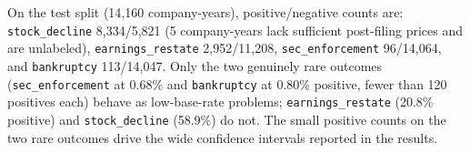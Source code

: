 On the test split (14{,}160 company-years), positive/negative counts are: \texttt{stock\_decline} 8{,}334/5{,}821 (5 company-years lack sufficient post-filing prices and are unlabeled), \texttt{earnings\_restate} 2{,}952/11{,}208, \texttt{sec\_enforcement} 96/14{,}064, and \texttt{bankruptcy} 113/14{,}047. Only the two genuinely rare outcomes (\texttt{sec\_enforcement} at 0.68\% and \texttt{bankruptcy} at 0.80\% positive, fewer than 120 positives each) behave as low-base-rate problems; \texttt{earnings\_restate} (20.8\% positive) and \texttt{stock\_decline} (58.9\%) do not. The small positive counts on the two rare outcomes drive the wide confidence intervals reported in the results.
